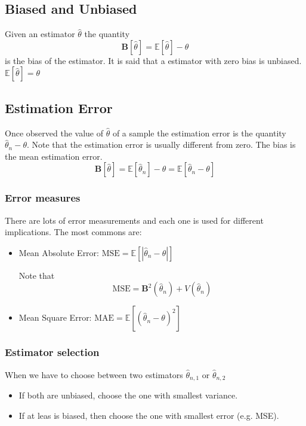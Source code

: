 \subsection{Biased and Unbiased}
Given an estimator $\hat{\theta}$ the quantity 
\[ \textbf{B}[\hat{\theta}] = \mathbb{E}[\hat\theta] - \theta \] is the bias of
the estimator. It is said that a estimator with zero bias is unbiased.
$\mathbb{E}[\hat\theta] = \theta$

\subsection{Estimation Error}
Once observed the value of $\hat{\theta}$ of a sample the estimation error is
the quantity $\hat{\theta}_n - \theta$. Note that the estimation error is
usually different from zero. The bias is the mean estimation error.
\[ \textbf{B}[\hat{\theta}] = \mathbb{E}[\hat{\theta}_n] - \theta =
\mathbb{E}[\hat{\theta}_n - \theta] \]

\subsubsection{Error measures}
There are lots of error measurements and each one is used for different
implications. The most commons are:
\begin{itemize}
    \item Mean Absolute Error: $\text{MSE} = \mathbb{E}[|\hat{\theta}_n -
    \theta|]$
    \begin{tcolorbox}
        Note that \[ \text{MSE} = \textbf{B}^2(\hat{\theta}_n) +
        V(\hat{\theta}_n) \]
    \end{tcolorbox}
    \item Mean Square Error: $\text{MAE} = \mathbb{E}[(\hat{\theta}_n -
    \theta)^2]$
\end{itemize}

\subsubsection{Estimator selection}
When we have to choose between two estimators $\hat{\theta}_{n,1}$ or
$\hat{\theta}_{n,2}$
\begin{itemize}
    \item If both are unbiased, choose the one with smallest variance.
    \item If at leas is biased, then choose the one with smallest error (e.g.
    MSE).
\end{itemize}

